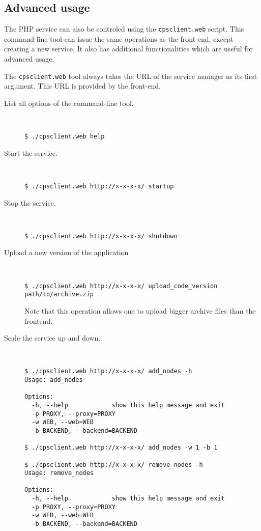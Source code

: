 \documentclass[10pt]{article}
\begin{document}
\subsection{Advanced usage}

The PHP service can also be controled using the \texttt{cpsclient.web}
script. This command-line tool can issue the same operations as the
front-end, except creating a new service. It also has additional
functionalities which are useful for advanced usage.

The \texttt{cpsclient.web} tool always takes the URL of the service
manager as its first argument. This URL is provided by the front-end.

\begin{description}
\item[List all options of the command-line tool.]~
\begin{verbatim}
$ ./cpsclient.web help
\end{verbatim}

\item[Start the service.]~
\begin{verbatim}
$ ./cpsclient.web http://x-x-x-x/ startup
\end{verbatim}

\item[Stop the service.]~
\begin{verbatim}
$ ./cpsclient.web http://x-x-x-x/ shutdown
\end{verbatim}

\item[Upload a new version of the application]~
\begin{verbatim}
$ ./cpsclient.web http://x-x-x-x/ upload_code_version path/to/archive.zip
\end{verbatim}
Note that this operation allows one to upload bigger archive files than the frontend.

\item[Scale the service up and down.]~
\begin{verbatim}
$ ./cpsclient.web http://x-x-x-x/ add_nodes -h
Usage: add_nodes

Options:
  -h, --help            show this help message and exit
  -p PROXY, --proxy=PROXY
  -w WEB, --web=WEB     
  -b BACKEND, --backend=BACKEND

$ ./cpsclient.web http://x-x-x-x/ add_nodes -w 1 -b 1

$ ./cpsclient.web http://x-x-x-x/ remove_nodes -h
Usage: remove_nodes

Options:
  -h, --help            show this help message and exit
  -p PROXY, --proxy=PROXY
  -w WEB, --web=WEB     
  -b BACKEND, --backend=BACKEND


\end{verbatim}
\end{description}
\end{document}
